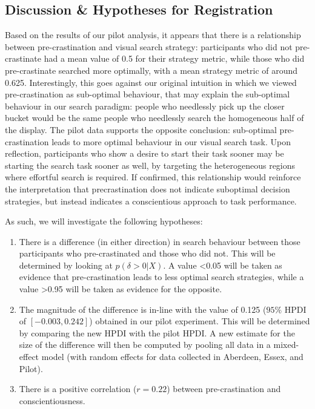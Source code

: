 \documentclass[]{rsos}
\begin{document}
\subsection{Discussion \& Hypotheses for Registration}

Based on the results of our pilot analysis, it appears that there is a relationship between pre-crastination and visual search strategy: participants who did not pre-crastinate had a mean value of 0.5 for their strategy metric, while those who did pre-crastinate searched more optimally, with a mean strategy metric of around 0.625. Interestingly, this goes against our original intuition in which we viewed pre-crastination as sub-optimal behaviour, that may explain the sub-optimal behaviour in our search paradigm: people who needlessly pick up the closer bucket would be the same people who needlessly search the homogeneous half of the display. The pilot data supports the opposite conclusion: sub-optimal pre-crastination leads to more optimal behaviour in our visual search task. Upon reflection, participants who show a desire to start their task sooner may be starting the search task sooner as well, by targeting the heterogeneous regions where effortful search is required. If confirmed, this relationship would reinforce the interpretation that precrastination does not indicate suboptimal decision strategies, but instead indicates a conscientious approach to task performance.

As such, we will investigate the following hypotheses:

\begin{enumerate}
\item There is a difference (in either direction) in search behaviour between those participants who pre-crastinated and those who did not. This will be determined by looking at $p(\delta>0 | X)$. A value <0.05 will be taken as evidence that pre-crastination leads to less optimal search strategies, while a value >0.95 will be taken as evidence for the opposite.
\item The magnitude of the difference is in-line with the value of 0.125 ($95\%$ HPDI of $[-0.003, 0.242]$) obtained in our pilot experiment. This will be determined by comparing the new HPDI with the pilot HPDI. A new estimate for the size of the difference will then be computed by pooling all data in a mixed-effect model (with random effects for data collected in Aberdeen, Essex, and Pilot).
\item There is a positive correlation ($r=0.22$) between pre-crastination and conscientiousness.
\end{enumerate}
\end{document}
